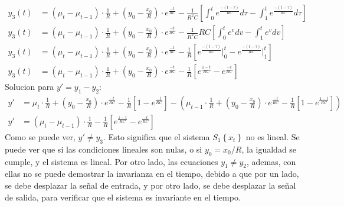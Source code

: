 \documentclass[12pt,a4paper]{report}
\begin{document}
\begin{enumerate}[label=\alph*)]
\begin{align*}
        y_3(t) &= (\mu_t - \mu_{t-1}) \cdot \frac{1}{R} + \left(y_0 - \frac{x_0}{R}\right) \cdot e^{\frac{-t}{RC}} -
        \frac{1}{R^2C} \left[\int_{0}^{t} e^{\frac{-(t-\tau)}{RC}} d\tau -
          \int_{1}^{t} e^{\frac{-(t-\tau)}{RC}} d\tau \right]\\[6pt]
        y_3(t) &= (\mu_t - \mu_{t-1}) \cdot \frac{1}{R} + \left(y_0 - \frac{x_0}{R}\right) \cdot e^{\frac{-t}{RC}} -
          \frac{1}{R^2C} RC\left[\int_{0}^{t} e^v dv - \int_{1}^{t} e^v dv \right]\\[6pt]
        y_3(t) &= (\mu_t - \mu_{t-1}) \cdot \frac{1}{R} + \left(y_0 - \frac{x_0}{R}\right) \cdot e^{\frac{-t}{RC}} -
          \frac{1}{R}\left[e^{\frac{-(t-\tau)}{RC}} \Big|_{0}^{t} -
          e^{\frac{-(t-\tau)}{RC}} \Big|_{1}^{t} \right]\\[6pt]
        y_3(t) &= (\mu_t - \mu_{t-1}) \cdot \frac{1}{R} + \left(y_0 - \frac{x_0}{R}\right) \cdot e^{\frac{-t}{RC}} -
          \frac{1}{R} \left[e^{\frac{1-t}{RC}} - e^{\frac{-t}{RC}}\right]
      \end{align*}
      Solucion para $y' = y_1 - y_2$:
      \begin{align*}
        y' &= \mu_t \cdot \frac{1}{R} + \left(y_0 - \frac{x_0}{R}\right) \cdot e^{\frac{-t}{RC}} - \frac{1}{R}
          \left[1 - e^{\frac{-t}{RC}}\right] - \left(\mu_{t-1} \cdot \frac{1}{R} + \left(y_0 -
          \frac{x_0}{R}\right) \cdot e^{\frac{-t}{RC}} - \frac{1}{R} \left[1 - e^{\frac{1-t}{RC}}\right]\right)\\[6pt]
        y' &= (\mu_t - \mu_{t-1}) \cdot \frac{1}{R} - \frac{1}{R} \left[e^{\frac{1-t}{RC}} - e^{\frac{-t}{RC}}\right]
      \end{align*}
      Como se puede ver, $y' \neq y_3$. Esto significa que el sistema $S_1\left\{x_t\right\}$ no es lineal. Se puede
      ver que si las condiciones lineales son nulas, o si $y_0 = x_0/R$, la igualdad se cumple, y el sistema es lineal.
      Por otro lado, las ecuaciones $y_1 \neq y_2$, ademas, con ellas no se puede demostrar la invarianza en el tiempo,
      debido a que por un lado, se debe desplazar la señal de entrada, y por otro lado, se debe desplazar la señal de
      salida, para verificar que el sistema es invariante en el tiempo.\\


\end{enumerate}
\end{document}
